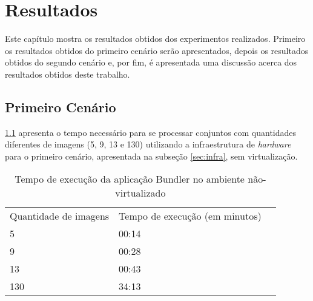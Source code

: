 \chapter[Resultados]{Resultados}

Este capítulo mostra os resultados obtidos dos experimentos realizados. Primeiro os resultados obtidos do primeiro cenário serão apresentados, depois os resultados obtidos do segundo cenário e, por fim, é apresentada uma discussão acerca dos resultados obtidos deste trabalho.

\section{Primeiro Cenário}

\ref{tabela-tempo-execucao-nativo-cenario1} apresenta o tempo necessário para se processar conjuntos com quantidades diferentes de imagens (5, 9, 13 e 130) utilizando a infraestrutura de \textit{hardware} para o primeiro cenário, apresentada na subse\-ção \ref{sec:infra}, sem virtualização. 





\begin{table}[h]
\centering
\caption{Tempo de execução da aplicação Bundler no ambiente não-virtualizado}
\label{tabela-tempo-execucao-nativo-cenario1}
\begin{tabular}{|l|l|l}
\cline{1-2}
Quantidade de imagens & Tempo de execução (em minutos) &  \\ \cline{1-2}
5                 & 00:14                          &  \\ \cline{1-2}
9                 & 00:28                          &  \\ \cline{1-2}
13                & 00:43                          &  \\ \cline{1-2}
130               & 34:13                          &  \\ \cline{1-2}
\end{tabular}
\end{table}
